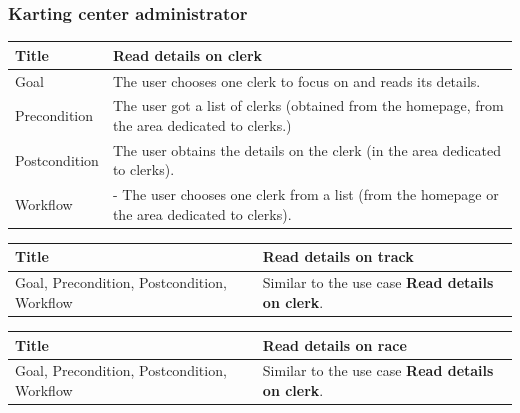 \documentclass{beamer}
\begin{document}
\begin{frame}
    \frametitle{Karting center administrator}
    \begin{table}
        \tiny
        \begin{tabular}{|p{2cm}|p{6cm}|}
        \hline  
        Title & \textbf{Read details on clerk} \\
        \hline
        Goal & The user chooses one clerk to focus on and reads its details. \\
        \hline
        Precondition & The user got a list of clerks (obtained from the homepage,
        from the area dedicated to clerks.)\\
        \hline
        Postcondition & The user obtains the details on the clerk (in the area dedicated to clerks). \\
        \hline
        Workflow &
        - The user chooses one clerk from a list (from the homepage or the area dedicated to clerks). \\
        \hline
        \end{tabular}
\end{table}

\begin{table}
    \tiny
    \begin{tabular}{|p{2cm}|p{6cm}|}
    \hline  
    Title & \textbf{Read details on track} \\
    \hline
    Goal, Precondition, Postcondition, Workflow & Similar to the use case \textbf{Read details on clerk}.\\
    \hline
    \end{tabular}
\end{table}

\begin{table}
    \tiny
    \begin{tabular}{|p{2cm}|p{6cm}|}
    \hline  
    Title & \textbf{Read details on race} \\
    \hline
    Goal, Precondition, Postcondition, Workflow & Similar to the use case \textbf{Read details on clerk}.\\
    \hline
    \end{tabular}
\end{table}
\end{frame}
\end{document}

